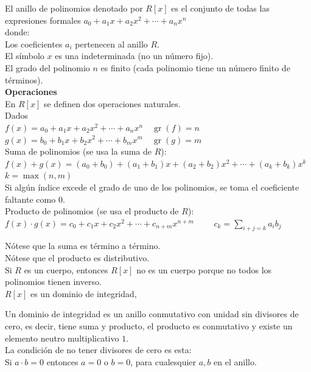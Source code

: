 \begin{definicion}\label{def:anilloPolinomios}
El anillo de polinomios denotado por $R[x]$ es el conjunto de todas las expresiones formales $a_0 + a_1x + a_2x^2 + \cdots + a_nx^n$ \\
donde: \\
Los coeficientes $a_i$ pertenecen al anillo $R$. \\
El símbolo $x$ es una indeterminada (no un número fijo). \\
El grado del polinomio $n$ es finito (cada polinomio tiene un número finito de términos). \\
\textbf{Operaciones} \\
En $R[x]$ se definen dos operaciones naturales. \\
Dados \\
$f(x) = a_0 + a_1x + a_2x^2 + \cdots + a_nx^n \quad \operatorname{gr}(f)=n$ \\
$g(x) = b_0 + b_1x + b_2x^2 + \cdots + b_mx^m \quad \operatorname{gr}(g)=m$ \\
Suma de polinomios (se usa la suma de $R$): \\
$f(x) + g(x) = (a_0+b_0) + (a_1+b_1)x + (a_2+b_2)x^2 + \cdots + (a_k+b_k)x^k \qquad$ $k = \max(n,m)$ \\
Si algún índice excede el grado de uno de los polinomios, se toma el coeficiente faltante como 0. \\
Producto de polinomios (se usa el producto de $R$): \\
$f(x) \cdot g(x) = c_0 + c_1x + c_2x^2 + \cdots + c_{n+m}x^{n+m} \qquad$ $c_k = \sum_{i+j=k} a_i b_j$ \\
\end{definicion}

Nótese que la suma es término a término. \\
Nótese que el producto es distributivo. \\
Si $R$ es un cuerpo, entonces $R[x]$ no es un cuerpo porque no todos los polinomios tienen inverso. \\
$R[x]$ es un dominio de integridad,

\begin{definicion}\label{def:domDeIntegr}
Un dominio de integridad es un anillo conmutativo con unidad sin divisores de cero, es decir, tiene suma y producto, el producto es conmutativo y existe un elemento neutro multiplicativo $1$. \\
La condición de no tener divisores de cero es esta: \\  
Si $a \cdot b = 0$ entonces $a = 0$ o $b = 0$, para cualesquier $a,b$ en el anillo.
\end{definicion}

